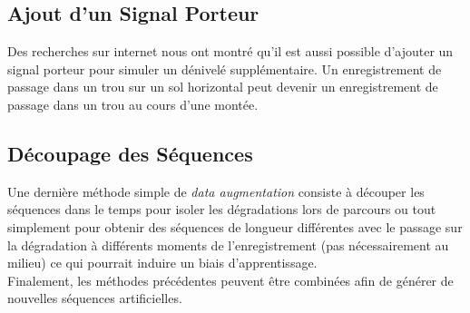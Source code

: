 \subsection{Ajout d'un Signal Porteur}
Des recherches sur internet \cite{TerryUm_ICMI2017} nous ont montré qu'il est aussi possible d'ajouter un signal porteur pour simuler un dénivelé supplémentaire. Un enregistrement de passage dans un trou sur un sol horizontal peut devenir un enregistrement de passage dans un trou au cours d'une montée.

\subsection{Découpage des Séquences}
Une dernière méthode simple de \textit{data augmentation} consiste à découper les séquences dans le temps pour isoler les dégradations lors de parcours ou tout simplement pour obtenir des séquences de longueur différentes avec le passage sur la dégradation à différents moments de l'enregistrement (pas nécessairement au milieu) ce qui pourrait induire un biais d'apprentissage.\\

Finalement, les méthodes précédentes peuvent être combinées afin de générer de nouvelles séquences artificielles.